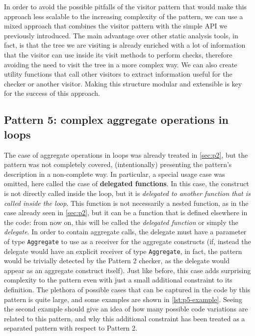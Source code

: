\documentclass[12pt,a4paper,openright,twoside]{book}
\begin{document}
In order to avoid the possible pitfalls of the visitor pattern that would make
this approach less scalable to the increasing complexity of the pattern, we can
use a mixed approach that combines the visitor pattern with the simple API we
previously introduced. The main advantage over other static analysis tools, in
fact, is that the tree we are visiting is already enriched with a lot of
information that the visitor can use inside its visit methods to perform checks,
therefore avoiding the need to visit the tree in a more complex way.
%
We can also create utility functions that call other visitors to extract
information useful for the checker or another visitor. Making this structure 
modular and extensible is key for the success of this approach.

\subsection{Pattern 5: complex aggregate operations in loops} \label{sec:p5}

The case of aggregate operations in loops was already treated in \cref{sec:p2},
but the pattern was not completely covered, (intentionally) presenting the
pattern's description in a non-complete way. In particular, a special usage
case was omitted, here called the case of \textbf{delegated functions}. 
%
In this case, the construct is not directly called inside the loop, but it is
\emph{delegated to another function that is called inside the loop}. This
function is not necessarily a nested function, as in the case already seen in
\cref{sec:p2}, but it can be a function that is defined elsewhere in the code:
from now on, this will be called the \emph{delegated function} or simply the
\emph{delegate}. In order to contain aggregate calls, the delegate must have a
parameter of type \lstinline{Aggregate} to use as a receiver for the aggregate
constructs (if, instead the delegate would have an explicit receiver of type
\lstinline{Aggregate}, in fact, the pattern would be trivially detected by the
Pattern 2 checker, as the delegate would appear as an aggregate construct
itself).
%
Just like before, this case adds surprising complexity to the pattern even with
just a small additional constraint to its definition. The plethora of possible
cases that can be captured in the code by this pattern is quite large, and some
examples are shown in \cref{lst:p5-example}. Seeing the second example should
give an idea of how many possible code variations are related to this pattern,
and why this additional constraint has been treated as a separated pattern with
respect to Pattern 2.
\end{document}
